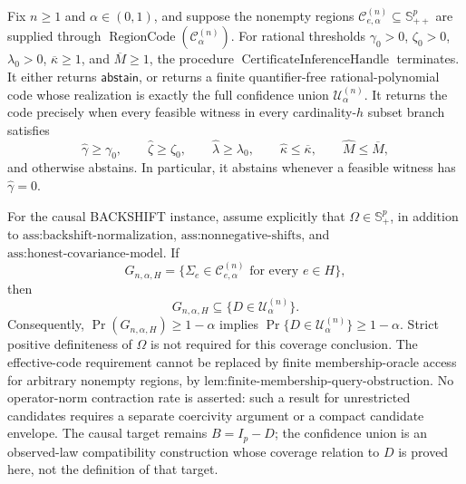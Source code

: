 Fix \(n\geq1\) and \(\alpha\in(0,1)\), and suppose the nonempty regions \(\mathcal C^{(n)}_{e,\alpha}\subseteq\mathbb S_{++}^p\) are supplied through \(\operatorname{RegionCode}(\mathcal C^{(n)}_\alpha)\).  For rational thresholds \(\gamma_0>0\), \(\zeta_0>0\), \(\lambda_0>0\), \(\overline\kappa\geq1\), and \(\overline M\geq1\), the procedure \(\operatorname{CertificateInferenceHandle}\) terminates.  It either returns \(\mathsf{abstain}\), or returns a finite quantifier-free rational-polynomial code whose realization is exactly the full confidence union \(\mathcal U^{(n)}_\alpha\).  It returns the code precisely when every feasible witness in every cardinality-\(h\) subset branch satisfies
\[
 \widehat\gamma\geq\gamma_0,
 \qquad \widehat\zeta\geq\zeta_0,
 \qquad \widehat\lambda\geq\lambda_0,
 \qquad \widehat\kappa\leq\overline\kappa,
 \qquad \widehat M\leq\overline M,
\]
and otherwise abstains.  In particular, it abstains whenever a feasible witness has \(\widehat\gamma=0\).

For the causal BACKSHIFT instance, assume explicitly that \(\Omega\in\mathbb S_+^p\), in addition to \(\text{ass:backshift-normalization}\), \(\text{ass:nonnegative-shifts}\), and \(\text{ass:honest-covariance-model}\).  If
\[
 G_{n,\alpha,H}
 =\{\Sigma_e\in\mathcal C^{(n)}_{e,\alpha}
     \text{ for every }e\in H\},
\]
then
\[
 G_{n,\alpha,H}\subseteq\{D\in\mathcal U^{(n)}_\alpha\}.
\]
Consequently, \(\Pr(G_{n,\alpha,H})\geq1-\alpha\) implies \(\Pr\{D\in\mathcal U^{(n)}_\alpha\}\geq1-\alpha\).  Strict positive definiteness of \(\Omega\) is not required for this coverage conclusion.  The effective-code requirement cannot be replaced by finite membership-oracle access for arbitrary nonempty regions, by \(\text{lem:finite-membership-query-obstruction}\).  No operator-norm contraction rate is asserted: such a result for unrestricted candidates requires a separate coercivity argument or a compact candidate envelope.  The causal target remains \(B=I_p-D\); the confidence union is an observed-law compatibility construction whose coverage relation to \(D\) is proved here, not the definition of that target.